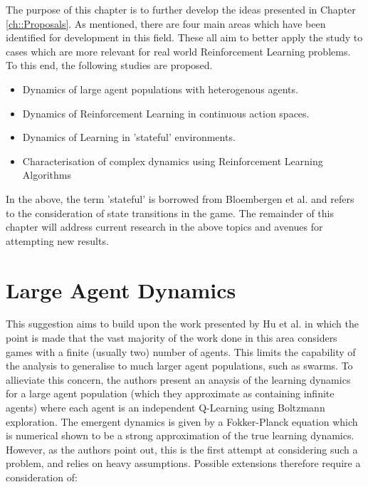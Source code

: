 \documentclass[../sample.tex]{subfiles}
\begin{document}
    The purpose of this chapter is to further develop the ideas presented in Chapter
    \ref{ch::Proposals}. As mentioned, there are four main areas which have been identified for
    development in this field. These all aim to better apply the study to cases which are more
    relevant for real world Reinforcement Learning problems. To this end, the following studies are
    proposed.
    
    \begin{itemize}
        \item Dynamics of large agent populations with heterogenous agents.
        \item Dynamics of Reinforcement Learning in continuous action spaces.
        \item Dynamics of Learning in 'stateful' environments.
        \item Characterisation of complex dynamics using Reinforcement Learning Algorithms
    \end{itemize}

    In the above, the term 'stateful' is borrowed from Bloembergen et al. \cite{Bloembergen2015} and
   refers to the consideration of state transitions in the game. The remainder of this chapter will
   address current research in the above topics and avenues for attempting new results.
   
   \section{Large Agent Dynamics}

    This suggestion aims to build upon the work presented by Hu et al. \cite{Hu2019} in which the
    point is made that the vast majority of the work done in this area considers games with a finite
    (usually two) number of agents. This limits the capability of the analysis to generalise to much
    larger agent populations, such as swarms. To allieviate this concern, the authors present an
    anaysis of the learning dynamics for a large agent population (which they approximate as
    containing infinite agents) where each agent is an independent Q-Learning using Boltzmann
    exploration. The emergent dynamics is given by a Fokker-Planck equation which is numerical shown
    to be a strong approximation of the true learning dynamics. However, as the authors point out,
    this is the first attempt at considering such a problem, and relies on heavy assumptions.
    Possible extensions therefore require a consideration of:
\end{document}

